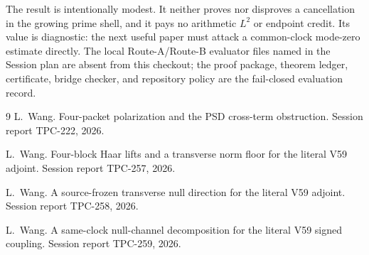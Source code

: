 \documentclass[11pt]{article}
\theoremstyle{definition}
\begin{document}
The result is intentionally modest.  It neither proves nor disproves a cancellation
in the growing prime shell, and it pays no arithmetic $L^2$ or endpoint credit.  Its
value is diagnostic: the next useful paper must attack a common-clock mode-zero
estimate directly.  The local Route-A/Route-B evaluator files named in the Session
plan are absent from this checkout; the proof package, theorem ledger, certificate,
bridge checker, and repository policy are the fail-closed evaluation record.


\begin{thebibliography}{9}
L.~Wang.
\newblock Four-packet polarization and the PSD cross-term obstruction.
\newblock Session report TPC-222, 2026.

L.~Wang.
\newblock Four-block Haar lifts and a transverse norm floor for the literal V59 adjoint.
\newblock Session report TPC-257, 2026.

L.~Wang.
\newblock A source-frozen transverse null direction for the literal V59 adjoint.
\newblock Session report TPC-258, 2026.

L.~Wang.
\newblock A same-clock null-channel decomposition for the literal V59 signed coupling.
\newblock Session report TPC-259, 2026.
\end{thebibliography}
\end{document}
